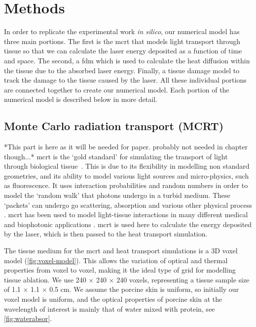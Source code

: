 \section{Methods}

In order to replicate the experimental work \textit{in silico}, our numerical model has three main portions. The first is the \gls{mcrt} that models light transport through tissue so that we can calculate the laser energy deposited as a function of time and space. The second, a \gls{fdm} which is used to calculate the heat diffusion within the tissue due to the absorbed laser energy. Finally, a tissue damage model to track the damage to the tissue caused by the laser. All these individual portions are connected together to create our numerical model. Each portion of the numerical model is described below in more detail.

\subsection{Monte Carlo radiation transport (MCRT)}

*This part is here as it will be needed for paper. probably not needed in chapter though...*
\gls{mcrt} is the `gold standard' for simulating the transport of light through biological tissue~\cite{kong2008efficient}. This is due to its flexibility in modelling non standard geometries, and its ability to model various light sources and micro-physics, such as fluorescence. It uses interaction probabilities and random numbers in order to model the `random walk' that photons undergo in a turbid medium. These `packets' can undergo go scattering, absorption and various other physical process \cite{yao1999monte,welch1997propagation}. \gls{mcrt} has been used to model light-tissue interactions in many different medical and biophotonic applications \cite{campbell2015monte,boas2002three,patwardhan2005monte}. \gls{mcrt} is used here to calculate the energy deposited by the laser, which is then passed to the heat transport simulation.

The tissue medium for the \gls{mcrt} and heat transport simulations is a 3D voxel model (\cref{fig:voxel-model}). This allows the variation of optical and thermal properties from voxel to voxel, making it the ideal type of grid for modelling tissue ablation. We use  240 $\times$ 240 $\times$ 240 voxels, representing a tissue sample size of 1.1 $\times$ 1.1 $\times$ 0.5 cm. We assume the porcine skin is uniform, so initially our voxel model is uniform, and the optical properties of porcine skin at the wavelength of interest is mainly that of water mixed with protein, see \cref{fig:waterabsor}.


